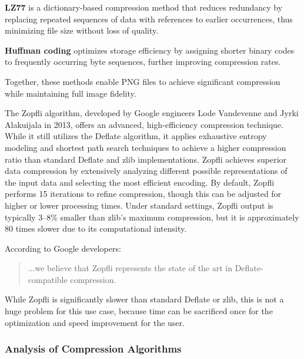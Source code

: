\begin{compactitem}
\item{}\textbf{LZ77} is a dictionary-based compression method that reduces redundancy by replacing repeated sequences of data with references to earlier occurrences, thus minimizing file size without loss of quality.
\item{}\textbf{Huffman coding} optimizes storage efficiency by assigning shorter binary codes to frequently occurring byte sequences, further improving compression rates.
\end{compactitem}

Together, these methods enable PNG files to achieve significant compression while maintaining full image fidelity.

The Zopfli algorithm\cite{ZopfliGitHub}, developed by Google engineers Lode Vandevenne and Jyrki Alakuijala in 2013, offers an advanced, high-efficiency compression technique. While it still utilizes the Deflate algorithm, it applies exhaustive entropy modeling and shortest path search techniques to achieve a higher compression ratio than standard Deflate and zlib\cite{ZlibGitHub} implementations. Zopfli achieves superior data compression by extensively analyzing different possible representations of the input data and selecting the most efficient encoding. By default, Zopfli performs 15 iterations to refine compression, though this can be adjusted for higher or lower processing times. Under standard settings, Zopfli output is typically 3–8\% smaller than zlib’s maximum compression, but it is approximately 80 times slower due to its computational intensity.

According to Google developers: \cite{ZopfliGoogleBlog}

\begin{quote}
    ...we believe that Zopfli represents the state of the art in Deflate-compatible compression.
\end{quote}

While Zopfli is significantly slower than standard Deflate or zlib, this is not a huge problem for this use case, because time can be sacrificed once for the optimization and speed improvement for the user.

\subsubsection{Analysis of Compression Algorithms}

